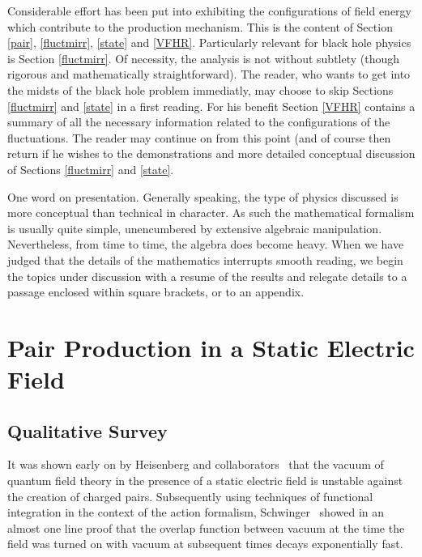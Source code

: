 \documentclass[12pt,oneside]{report}
\begin{document}
Considerable effort has been put into exhibiting the configurations of field
energy which contribute to the production mechanism. This is the content of
Section \ref{pair}, \ref{fluctmirr}, \ref{state} and \ref{VFHR}. Particularly
relevant for black hole physics is Section \ref{fluctmirr}. Of necessity, the
analysis is not without subtlety (though rigorous and mathematically
straightforward). The reader, who wants to get into the midsts of the
black hole problem immediatly, may choose to skip Sections \ref{fluctmirr} and
\ref{state} in a first reading. For his benefit Section \ref{VFHR} contains a
summary of all the necessary information related to the configurations of the
fluctuations. The reader may continue on from this point (and of course
then return if he wishes to the demonstrations and more detailed conceptual
discussion of Sections \ref{fluctmirr} and \ref{state}.



One word on presentation. Generally speaking, the type of physics discussed
is more conceptual than technical in character. As such the mathematical
formalism is usually quite simple, unencumbered by extensive algebraic
manipulation. Nevertheless, from time to time, the algebra does become
heavy. When we have judged 
that the details of the mathematics interrupts smooth reading, we begin
the topics under discussion with a resume of the results and relegate
details to a passage enclosed within square brackets, or to an appendix.

\strut \vfill \pagebreak



\chapter{Pair Production in a Static Electric Field}\label{ELEC}
\section{Qualitative Survey}\label{qualitative}
It was shown early on by Heisenberg and collaborators~\cite{HeEu} that the
vacuum of quantum field theory in the presence of a static
electric field is unstable against the creation of charged
pairs.  Subsequently using techniques of functional integration
in the context of the action formalism, Schwinger~\cite{Schw} showed in an
almost one line proof that the overlap function between vacuum
at the time the field was turned on with vacuum
at subsequent times decays exponentially fast.
\end{document}
